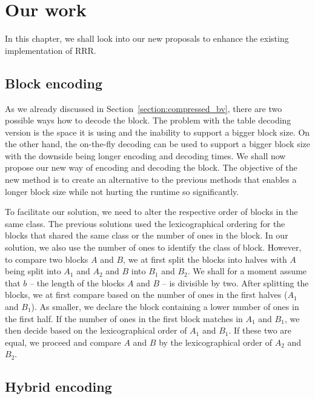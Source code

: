 \chapter{Our work}
\label{kap:kap3}

In this chapter, we shall look into our new proposals to enhance the existing implementation of RRR.

\section{Block encoding}

As we already discussed in Section~\ref{section:compressed_bv}, there are two possible ways how to
decode the block. The problem with the table decoding version is the space it is using and the inability to
support a bigger block size. On the other hand, the on-the-fly decoding can be used to support a bigger
block size with the downside being longer encoding and decoding times. We shall now propose our new
way of encoding and decoding the block. The objective of the new method is to create an alternative to
the previous methods that enables a longer block size while not hurting the runtime so significantly.

To facilitate our solution, we need to alter the respective order of blocks in the same class. The
previous solutions used the lexicographical ordering for the blocks that shared the same class or
the number of ones in the block. In our solution, we also use the number of ones to identify 
the class of block. However, to compare two blocks $A$ and $B$, we at first split the blocks into
halves with $A$ being split into $A_1$ and $A_2$ and $B$ into $B_1$ and $B_2$. We shall for a moment
assume that $b$ -- the length of the blocks $A$ and $B$ -- is divisible by two. After splitting the blocks,
we at first compare based on the number of ones in the first halves ($A_1$ and $B_1$). As smaller, we
declare the block containing a lower number of ones in the first half. If the number of ones in the first
block matches in $A_1$ and $B_1$, we then decide based on the lexicographical order of $A_1$ and $B_1$.
If these two are equal, we proceed and compare $A$ and $B$ by the lexicographical order of $A_2$ and $B_2$.

\section{Hybrid encoding}
